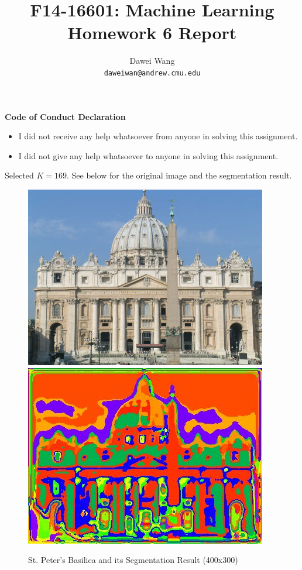 \documentclass{article}
\begin{document}
\title{F14-16601: Machine Learning \\ Homework 6 Report}
\author{Dawei Wang \\ {\tt daweiwan@andrew.cmu.edu}}
\maketitle
	
{\bf Code of Conduct Declaration} 	
\begin{itemize}\parskip0pt
	\item I did not receive any help whatsoever from anyone in solving this assignment. 
	\item I did not give any help whatsoever to anyone in solving this assignment. 
\end{itemize}

\vspace{0.5cm}	

Selected $K=169$. See below for the original image and the segmentation result. 
\begin{figure}[h!]
	\centering
	\includegraphics[scale = 0.5]{myBasilica.jpg}\hspace{0.2cm}
	\includegraphics[scale = 0.5]{myBasilicaSegmented.jpg}	
	\caption{St. Peter's Basilica and its Segmentation Result (400x300)} 
\end{figure}
\end{document}
